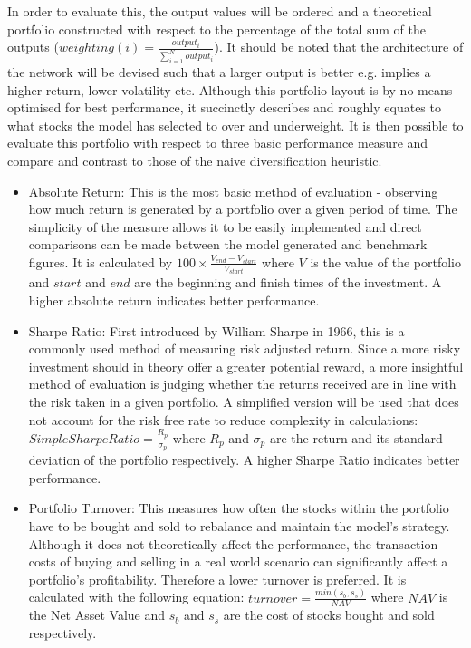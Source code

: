 \documentclass[10pt,onecolumn,letterpaper]{article}
\begin{document}
In order to evaluate this, the output values will be ordered and a theoretical portfolio constructed with respect to the percentage of the total sum of the outputs ($weighting(i) = \frac{output_{i} }{\sum_{i=1}^{N} output_{i}}$). It should be noted that the architecture of the network will be devised such that a larger output is better e.g. implies a higher return, lower volatility etc. Although this portfolio layout is by no means optimised for best performance, it succinctly describes and roughly equates to what stocks the model has selected to over and underweight. It is then possible to evaluate this portfolio with respect to three basic performance measure and compare and contrast to those of the naive diversification heuristic. 

\begin{itemize}
	\item Absolute Return: This is the most basic method of evaluation - observing how much return is generated by a portfolio over a given period of time. The simplicity of the measure allows it to be easily implemented and direct comparisons can be made between the model generated and benchmark figures. It is calculated by $100\times \frac{V_{end} - V_{start}}{V_{start}}$ where $V$ is the value of the portfolio and $start$ and $end$ are the beginning and finish times of the investment. A higher absolute return indicates better performance. 
	\item	Sharpe Ratio: First introduced by William Sharpe\cite{Sharpe} in 1966, this is a commonly used method of measuring risk adjusted return. Since a more risky investment should in theory offer a greater potential reward, a more insightful method of evaluation is judging whether the returns received are in line with the risk taken in a given portfolio. A simplified version will be used that does not account for the risk free rate to reduce complexity in calculations: $Simple Sharpe Ratio = \frac{R_{p}}{\sigma_{p}}$ where $R_{p}$ and $\sigma_p$ are the return and its standard deviation of the portfolio respectively. A higher Sharpe Ratio indicates better performance.  
	\item Portfolio Turnover: This measures how often the stocks within the portfolio have to be bought and sold to rebalance and maintain the model's strategy. Although it does not theoretically affect the performance, the transaction costs of buying and selling in a real world scenario can significantly affect a portfolio's profitability. Therefore a lower turnover is preferred. It is calculated with the following equation: $turnover = \frac{min(s_{b}, s_{s})}{NAV}$ where $NAV$ is the Net Asset Value and $s_{b}$ and $s_{s}$ are the cost of stocks bought and sold respectively.  
\end{itemize}
\end{document}

